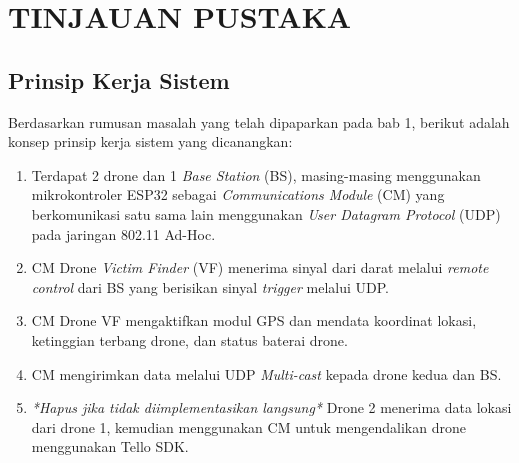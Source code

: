 \documentclass[main]{subfiles}
\begin{document}
\pagestyle{myheadings} %
\chapter{TINJAUAN PUSTAKA}

\section{Prinsip Kerja Sistem}
Berdasarkan rumusan masalah yang telah dipaparkan pada bab 1, berikut adalah konsep prinsip kerja sistem yang dicanangkan:
\begin{enumerate}
	\item Terdapat 2 drone dan 1 \textit{Base Station} (BS), masing-masing menggunakan mikrokontroler ESP32 sebagai \textit{Communications Module} (CM) yang berkomunikasi satu sama lain menggunakan \textit{User Datagram Protocol} (UDP) pada jaringan 802.11 Ad-Hoc.
	\item CM Drone \textit{Victim Finder} (VF) menerima sinyal dari darat melalui \textit{remote control} dari BS yang berisikan sinyal \textit{trigger} melalui UDP.
	\item CM Drone VF mengaktifkan modul GPS dan mendata koordinat lokasi, ketinggian terbang drone, dan status baterai drone.
	\item CM mengirimkan data melalui UDP \textit{Multi-cast} kepada drone kedua dan BS.
	\item \textit{*Hapus jika tidak diimplementasikan langsung*} Drone 2 menerima data lokasi dari drone 1, kemudian menggunakan CM untuk mengendalikan drone menggunakan Tello SDK.
\end{enumerate}
\end{document}
